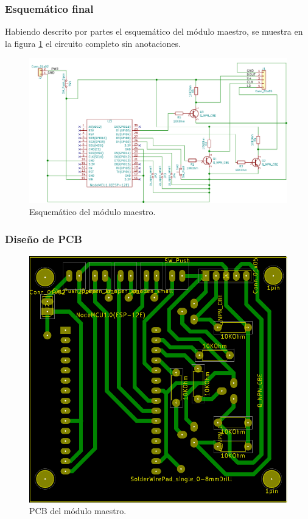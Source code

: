 \subsubsection{Esquemático final}
Habiendo descrito por partes el esquemático del módulo maestro, se muestra en la figura \ref{fig:esquematico-master} el circuito completo sin anotaciones.

\begin{figure}[ht!]
	\centering
	\includegraphics[width=\linewidth]{imagenes/esquematico-master.pdf}
	\caption{Esquemático del módulo maestro.}
	\label{fig:esquematico-master}
\end{figure}

\subsubsection{Diseño de PCB}

\begin{figure}[ht!]
	\centering
	\includegraphics[width=\linewidth]{imagenes/pcb-master.pdf}
	\caption{PCB del módulo maestro.}
	\label{fig:pcb-master}
\end{figure}

